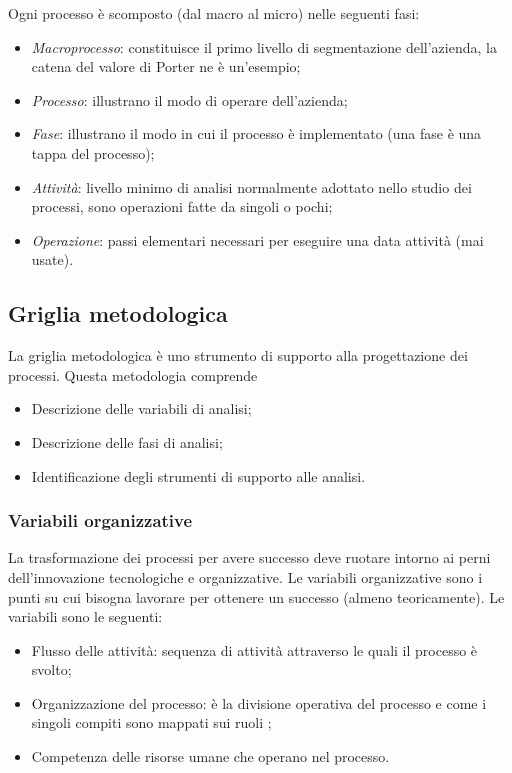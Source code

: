 \documentclass[a4paper, 10pt]{article}
\begin{document}
	Ogni processo è scomposto (dal macro al micro) nelle seguenti fasi: \begin{itemize}
		\item \textit{Macroprocesso}: constituisce il primo livello di segmentazione dell'azienda, la catena del valore di Porter ne è un'esempio;
		\item \textit{Processo}: illustrano il modo di operare dell'azienda;
		\item \textit{Fase}: illustrano il modo in cui il processo è implementato (una fase è una tappa del processo);
		\item \textit{Attività}: livello minimo di analisi normalmente adottato nello studio dei processi, sono operazioni fatte da singoli o pochi;
		\item \textit{Operazione}: passi elementari necessari per eseguire una data attività (mai usate).
	\end{itemize}

	\subsection{Griglia metodologica}
	
	La griglia metodologica è uno strumento di supporto alla progettazione dei processi. Questa metodologia comprende\begin{itemize}
		\item Descrizione delle variabili di analisi;
		\item Descrizione delle fasi di analisi;
		\item Identificazione degli strumenti di supporto alle analisi.
	\end{itemize}

	\subsubsection{Variabili organizzative}
	La trasformazione dei processi per avere successo deve ruotare intorno ai perni dell'innovazione tecnologiche e organizzative. Le variabili organizzative sono i punti su cui bisogna lavorare per ottenere un successo (almeno teoricamente). Le variabili sono le seguenti: \begin{itemize}
		\item Flusso delle attività: sequenza di attività attraverso le quali il processo è svolto;
		\item Organizzazione del processo: è la divisione operativa del processo e come i singoli compiti sono mappati sui ruoli ;
		\item Competenza delle risorse umane che operano nel processo.
	\end{itemize}
	
\end{document}
